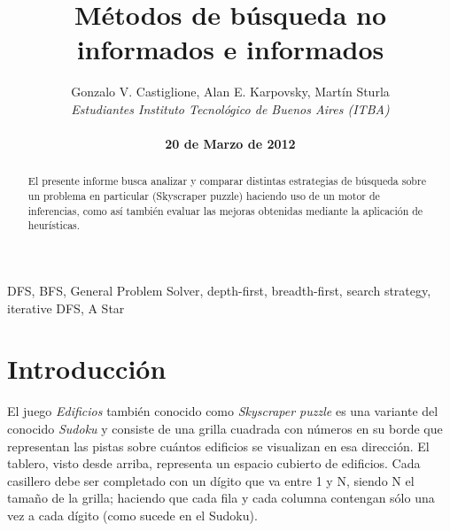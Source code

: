 \documentclass[%
    final,
    reprint,
    notitlepage,
    narroweqnarray,
    inline,
    twoside,
    invited
    ]{ieee}
\begin{document}
\title[Métodos de búsqueda no informados e informados]{%
       Métodos de búsqueda no informados e informados}

\author[Castiglione, Karpovsky, Sturla]{Gonzalo V. Castiglione, Alan E. Karpovsky, Martín Sturla\\\textit{Estudiantes 
       Instituto Tecnológico de Buenos Aires (ITBA)}\\
\\\textbf{20 de Marzo de 2012}
}



\lognumber{}
\pubitemident{}


\maketitle               

\begin{abstract} 
El presente informe busca analizar y comparar distintas estrategias de búsqueda sobre un problema en particular (Skyscraper puzzle) haciendo uso de un motor de inferencias, como así también evaluar las mejoras obtenidas mediante la aplicación de heurísticas.
\end{abstract}

\begin{keywords}
DFS, BFS, General Problem Solver, depth-first, breadth-first, search strategy, iterative DFS, A Star
\end{keywords}

\section{Introducción}

\PARstart El juego \textit{Edificios} también conocido como \textit{Skyscraper puzzle} es una variante del conocido \textit{Sudoku} y consiste de una grilla cuadrada con números en su borde que representan las pistas sobre cuántos edificios se visualizan en esa dirección. El tablero, visto desde arriba, representa un espacio cubierto de edificios. Cada casillero debe ser completado con un dígito que va entre 1 y N, siendo N el tamaño de la grilla; haciendo que cada fila y cada columna contengan sólo una vez a cada dígito (como sucede en el Sudoku).
\end{document}
